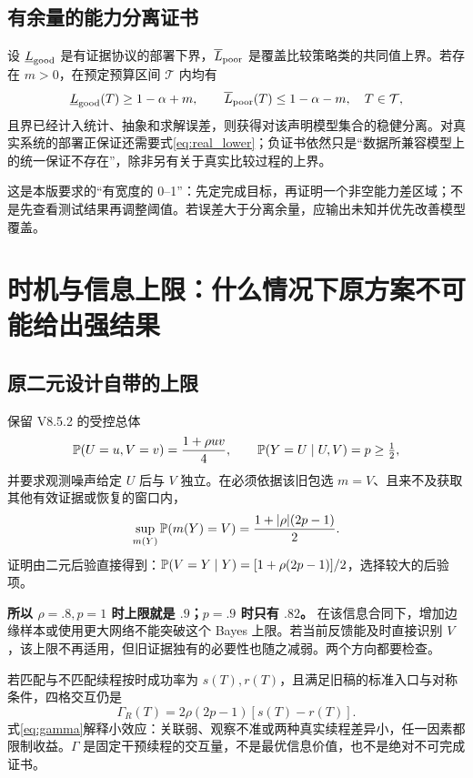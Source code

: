\documentclass[11pt,a4paper,fontset=fandol]{ctexart}
\theoremstyle{definition}
\theoremstyle{remark}\newtheorem{remark}[theorem]{说明}
\numberwithin{equation}{section}
\begin{document}
\subsection{有余量的能力分离证书}
设 $\underline L_{\rm good}$ 是有证据协议的部署下界，$\overline L_{\rm poor}$ 是覆盖比较策略类的共同值上界。若存在 $m>0$，在预定预算区间 $\mathcal T$ 内均有
\begin{equation}
 \underline L_{\rm good}(T)\ge1-\alpha+m,
 \qquad
 \overline L_{\rm poor}(T)\le1-\alpha-m,
 \quad T\in\mathcal T,
 \label{eq:margin}
\end{equation}
且界已经计入统计、抽象和求解误差，则获得对该声明模型集合的稳健分离。对真实系统的部署正保证还需要式\eqref{eq:real_lower}；负证书依然只是“数据所兼容模型上的统一保证不存在”，除非另有关于真实比较过程的上界。

这是本版要求的“有宽度的 0--1”：先定完成目标，再证明一个非空能力差区域；不是先查看测试结果再调整阈值。若误差大于分离余量，应输出未知并优先改善模型覆盖。

\section{时机与信息上限：什么情况下原方案不可能给出强结果}
\label{sec:timing}
\subsection{原二元设计自带的上限}
保留 V8.5.2 的受控总体
\begin{equation}
 \mathbb P(U=u,V=v)=\frac{1+\rho uv}{4},\qquad
 \mathbb P(Y=U\mid U,V)=p\ge\tfrac12,
 \label{eq:rho}
\end{equation}
并要求观测噪声给定 $U$ 后与 $V$ 独立。在必须依据该旧包选 $m=V$、且来不及获取其他有效证据或恢复的窗口内，
\begin{equation}
 \sup_{m(Y)}\mathbb P(m(Y)=V)=\frac{1+|\rho|(2p-1)}{2}.
 \label{eq:info_ceiling}
\end{equation}
证明由二元后验直接得到：$\mathbb P(V=Y\mid Y)=[1+\rho(2p-1)]/2$，选择较大的后验项。

\textbf{所以 $\rho=.8,p=1$ 时上限就是 $.9$；$p=.9$ 时只有 $.82$。} 在该信息合同下，增加边缘样本或使用更大网络不能突破这个 Bayes 上限。若当前反馈能及时直接识别 $V$，该上限不再适用，但旧证据独有的必要性也随之减弱。两个方向都要检查。

若匹配与不匹配续程按时成功率为 $s(T),r(T)$，且满足旧稿的标准入口与对称条件，四格交互仍是
\begin{equation}
 \Gamma_R(T)=2\rho(2p-1)[s(T)-r(T)].
 \label{eq:gamma}
\end{equation}
式\eqref{eq:gamma}解释小效应：关联弱、观察不准或两种真实续程差异小，任一因素都限制收益。$\Gamma$ 是固定干预续程的交互量，不是最优信息价值，也不是绝对不可完成证书。
\end{document}
